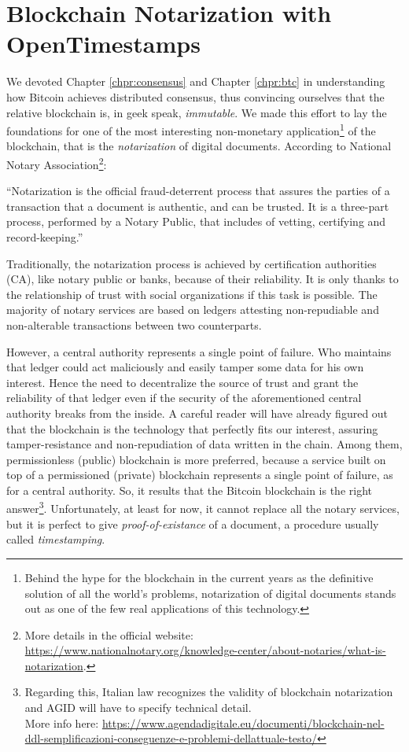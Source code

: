 \chapter{Blockchain Notarization with OpenTimestamps}
\label{chpr:notarization}

We devoted Chapter \ref{chpr:consensus} and Chapter \ref{chpr:btc} in understanding how Bitcoin achieves distributed consensus, thus convincing ourselves that the relative blockchain is, in geek speak, \textit{immutable}. We made this effort to lay the foundations for one of the most interesting non-monetary application\footnote{Behind the hype for the blockchain in the current years as the definitive solution of all the world's problems, notarization of digital documents stands out as one of the few real applications of this technology.} of the blockchain, that is the \textit{notarization} of digital documents. According to National Notary Association\footnote{More details in the official website: \url{https://www.nationalnotary.org/knowledge-center/about-notaries/what-is-notarization}.}:

\bigskip
\noindent
\enquote{Notarization is the official fraud-deterrent process that assures the parties of a transaction that a document is authentic, and can be trusted. It is a three-part process, performed by a Notary Public, that includes of vetting, certifying and record-keeping.}

\bigskip
\noindent
Traditionally, the notarization process is achieved by certification authorities (CA), like notary public or banks, because of their reliability. It is only thanks to the relationship of trust with social organizations if this task is possible. The majority of notary services are based on ledgers attesting non-repudiable and non-alterable transactions between two counterparts.

\bigskip
\noindent
However, a central authority represents a single point of failure. Who maintains that ledger could act maliciously and easily tamper some data for his own interest. Hence the need to decentralize the source of trust and grant the reliability of that ledger even if the security of the aforementioned central authority breaks from the inside. A careful reader will have already figured out that the blockchain is the technology that perfectly fits our interest, assuring tamper-resistance and non-repudiation of data written in the chain. Among them, permissionless (public) blockchain is more preferred, because a service built on top of a permissioned (private) blockchain represents a single point of failure, as for a central authority. So, it results that the Bitcoin blockchain is the right answer\footnote{Regarding this, Italian law recognizes the validity of blockchain notarization and AGID will have to specify technical detail. \\ More info here: \url{https://www.agendadigitale.eu/documenti/blockchain-nel-ddl-semplificazioni-conseguenze-e-problemi-dellattuale-testo/}}. Unfortunately, at least for now, it cannot replace all the notary services, but it is perfect to give \textit{proof-of-existance} of a document, a procedure usually called \textit{timestamping}.


